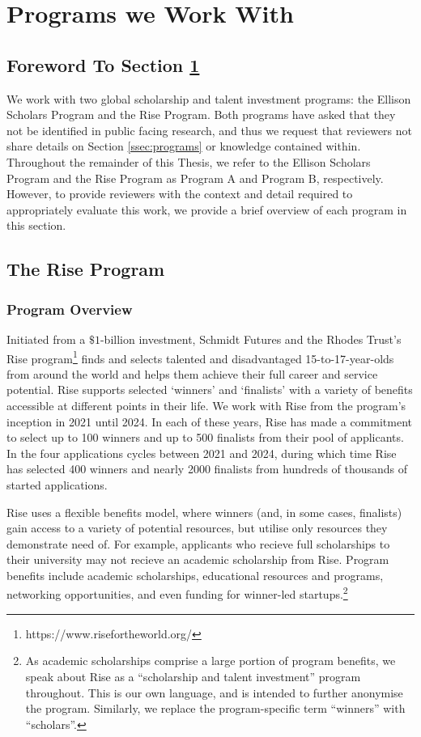 \section{Programs we Work With}\label{sec:programs}
\subsection{Foreword To Section \ref{sec:programs}}
We work with two global scholarship and talent investment programs: the Ellison Scholars Program and the Rise Program. Both programs have asked that they not be identified in public facing research, and thus we request that reviewers not share details on Section \ref{ssec:programs} or knowledge contained within. Throughout the remainder of this Thesis, we refer to the Ellison Scholars Program and the Rise Program as Program A and Program B, respectively. However, to provide reviewers with the context and detail required to appropriately evaluate this work, we provide a brief overview of each program in this section.

\subsection{The Rise Program}\label{ssec:rise}
\subsubsection{Program Overview}
Initiated from a $\$1$-billion investment, Schmidt Futures and the Rhodes Trust's Rise program\footnote{https://www.risefortheworld.org/} finds and selects talented and disadvantaged 15-to-17-year-olds from around the world and helps them achieve their full career and service potential. Rise supports selected `winners' and `finalists' with a variety of benefits accessible at different points in their life. We work with Rise from the program's inception in 2021 until 2024. In each of these years, Rise has made a commitment to select up to 100 winners and up to 500 finalists from their pool of applicants. In the four applications cycles between 2021 and 2024, during which time Rise has selected 400 winners and nearly 2000 finalists from hundreds of thousands of started applications.

Rise uses a flexible benefits model, where winners (and, in some cases, finalists) gain access to a variety of potential resources, but utilise only resources they demonstrate need of. For example, applicants who recieve full scholarships to their university may not recieve an academic scholarship from Rise. Program benefits include academic scholarships, educational resources and programs, networking opportunities, and even funding for winner-led startups.\footnote{As academic scholarships comprise a large portion of program benefits, we speak about Rise as a ``scholarship and talent investment'' program throughout. This is our own language, and is intended to further anonymise the program. Similarly, we replace the program-specific term ``winners'' with ``scholars''.}

